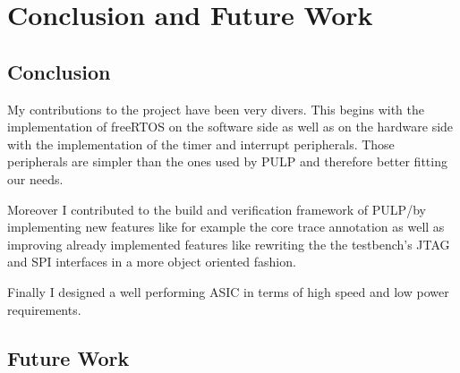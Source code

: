 
\chapter{Conclusion and Future Work}

\section{Conclusion}

My contributions to the project have been very divers. This begins with the implementation of freeRTOS on the software side as well as on the hardware side with the implementation of the timer and interrupt peripherals. Those peripherals are simpler than the ones used by PULP and therefore better fitting our needs.

Moreover I contributed to the build and verification framework of PULP/\pulpino by implementing new features like for example the core trace annotation as well as improving already implemented features like rewriting the the testbench's JTAG and SPI interfaces in a more object oriented fashion.

Finally I designed a well performing ASIC in terms of high speed and low power requirements.

\section{Future Work}

